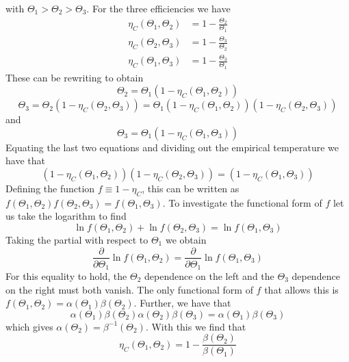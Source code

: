 \documentclass[12pt, a4paper, oneside, openright, titlepage]{book}
\begin{document}
with $\Theta_1 > \Theta_2 > \Theta_3$. For the three efficiencies we have \begin{align*}
    \eta_C(\Theta_1,\Theta_2) &= 1 - \frac{\Theta_2}{\Theta_1} \\
    \eta_C(\Theta_2,\Theta_3) &= 1 - \frac{\Theta_3}{\Theta_2} \\
    \eta_C(\Theta_1,\Theta_3) &= 1 - \frac{\Theta_3}{\Theta_1}
\end{align*}
These can be rewriting to obtain \begin{equation*}
    \Theta_2 = \Theta_1(1-\eta_C(\Theta_1,\Theta_2))
\end{equation*}
\begin{equation*}
    \Theta_3 = \Theta_2(1-\eta_C(\Theta_2,\Theta_3)) = \Theta_1(1-\eta_C(\Theta_1,\Theta_2))(1-\eta_C(\Theta_2,\Theta_3))
\end{equation*}
and \begin{equation*}
    \Theta_3 = \Theta_1(1-\eta_C(\Theta_1,\Theta_3))
\end{equation*}
Equating the last two equations and dividing out the empirical temperature we have that \begin{equation*}
    (1-\eta_C(\Theta_1,\Theta_2))(1-\eta_C(\Theta_2,\Theta_3)) = (1-\eta_C(\Theta_1,\Theta_3))
\end{equation*}
Defining the function $f \equiv 1 - \eta_C$, this can be written as $f(\Theta_1,\Theta_2)f(\Theta_2,\Theta_3) = f(\Theta_1,\Theta_3)$. To investigate the functional form of $f$ let us take the logarithm to find \begin{equation*}
    \ln f(\Theta_1,\Theta_2) + \ln f(\Theta_2,\Theta_3) = \ln f(\Theta_1,\Theta_3)
\end{equation*}
Taking the partial with respect to $\Theta_1$ we obtain \begin{equation*}
    \frac{\partial }{\partial\Theta_1}\ln f(\Theta_1,\Theta_2) = \frac{\partial }{\partial \Theta_1}\ln f(\Theta_1,\Theta_3)
\end{equation*}
For this equality to hold, the $\Theta_2$ dependence on the left and the $\Theta_3$ dependence on the right must both vanish. The only functional form of $f$ that allows this is $f(\Theta_1,\Theta_2) = \alpha(\Theta_1)\beta(\Theta_2)$. Further, we have that $$\alpha(\Theta_1)\beta(\Theta_2)\alpha(\Theta_2)\beta(\Theta_3) = \alpha(\Theta_1)\beta(\Theta_3)$$ which gives $\alpha(\Theta_2)=\beta^{-1}(\Theta_2)$. With this we find that \begin{equation*}
    \eta_C(\Theta_1,\Theta_2) = 1 - \frac{\beta(\Theta_2)}{\beta(\Theta_1)}
\end{equation*}
\end{document}
